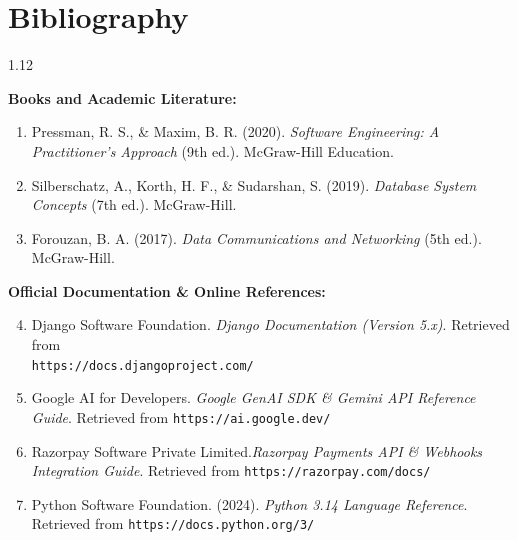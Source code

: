 \documentclass[12pt,a4paper]{article}
\begin{document}
\vspace{0.10in}


\section{Bibliography}

\vspace{0.06in}

{\fontsize{11.5}{15}\selectfont
\begin{spacing}{1.12}

\noindent
\textbf{Books and Academic Literature:}
\begin{enumerate}
    \setlength{\itemsep}{2pt}
    \item Pressman, R. S., \& Maxim, B. R. (2020). \textit{Software Engineering: A Practitioner's Approach} (9th ed.). McGraw-Hill Education.
    \item Silberschatz, A., Korth, H. F., \& Sudarshan, S. (2019). \textit{Database System Concepts} (7th ed.). McGraw-Hill.
    \item Forouzan, B. A. (2017). \textit{Data Communications and Networking} (5th ed.). McGraw-Hill.
\end{enumerate}

\vspace{0.06in}

\noindent
\textbf{Official Documentation \& Online References:}
\begin{enumerate}
    \setcounter{enumi}{3}
    \setlength{\itemsep}{2pt}
    \item Django Software Foundation. \textit{Django Documentation (Version 5.x)}. Retrieved from \\ \texttt{https://docs.djangoproject.com/}
    \item Google AI for Developers. \textit{Google GenAI SDK \& Gemini API Reference Guide}. Retrieved from \texttt{https://ai.google.dev/}
    \item Razorpay Software Private Limited.\textit{Razorpay Payments API \& Webhooks Integration Guide}. Retrieved from \texttt{https://razorpay.com/docs/}
    \item Python Software Foundation. (2024). \textit{Python 3.14 Language Reference}. Retrieved from \texttt{https://docs.python.org/3/}
\end{enumerate}

\end{spacing}
}

\vfill

\newpage


\end{document}

